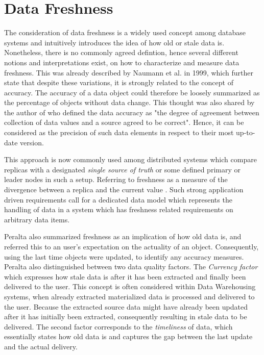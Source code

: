 \section{Data Freshness}
\label{sec:definition}
The consideration of data freshness is a widely used concept among database systems and intuitively introduces the idea of how old or stale data is.
Nonetheless, there is no commonly agreed defintion, hence several different notions and interpretations exist, on how to characterize and measure data freshness.
This was already described by Naumann et al. \cite{naumann:1999} in 1999, which further state that despite these variations, it is strongly related to the concept of accuracy. 
The accuracy of a data object could therefore be loosely summarized as the percentage of objects without data change. 
This thought was also shared by the author of \cite{redman:1996} who defined the data accuracy as "the degree of agreement between 
collection of data values and a source agreed to be correct".
Hence, it can be considered as the precision of such data elements in respect to their most up-to-date version.


This approach is now commonly used among distributed systems which compare replicas with a designated \emph{single source of truth} or some defined 
primary or leader nodes in such a setup. Referring to freshness as a measure of the divergence between a replica and the current value \cite{cite}.
Such strong application driven requirements call for a dedicated data model which represents the handling of data in a system which has
freshness related requirements on arbitrary data items.


Peralta \cite{peralta:2006} also summarized freshness as an implication of how old data is, and referred this to an user's expectation on the actuality of an object. 
Consequently, using the last time objects were updated, to identify any accuracy measures. Peralta also distinguished between two data quality factors. 
The \emph{Currency factor} which expresses how stale data is after it has been extracted and finally been
delivered to the user. This concept is often considered within Data Warehousing systems, when already extracted materialized data is processed and delivered to the user.
Because the extracted source data might have already been updated after it has initially been extracted, consequently resulting in stale data to be delivered.
The second factor corresponds to the \emph{timeliness} of data, which essentially states how old data is and captures the gap between the last update and the actual delivery.


